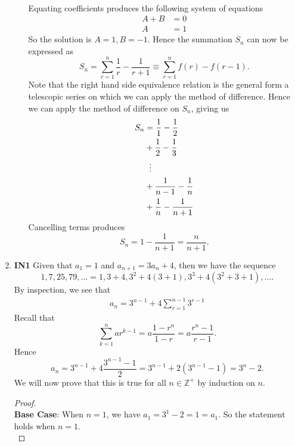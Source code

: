 \documentclass[12pt,oneside]{book}
\begin{document}
\begin{enumerate}
\begin{enumerate}
\begin{align*}
            \end{align*}
            Equating coefficients produces the following system of equations \begin{align*}
                A + B &= 0 \\
                A &= 1
            \end{align*}
            So the solution is $A = 1, B = -1$. Hence the summation $S_n$ can now be expressed as \[
                S_n = \sum_{r=1}^{n} \frac{1}{r} - \frac{1}{r+1} \equiv \sum_{r=1}^{n} f(r) - f(r-1)
            .\] 
            Note that the right hand side equivalence relation is the general form a telescopic series on which we can apply the method of difference. Hence we can apply the method of difference on $S_n$, giving us \begin{align*}
                S_n &= \frac{1}{1} - \frac{1}{2} \\
                    &+ \frac{1}{2} - \frac{1}{3} \\
                    &\hspace{2mm}\vdots \\
                    &+ \frac{1}{n-1} - \frac{1}{n} \\
                    &+ \frac{1}{n} - \frac{1}{n+1}
            \end{align*}
            Cancelling terms produces \[
                S_n = 1 - \frac{1}{n+1} = \frac{n}{n+1}
            .\] 
        \end{enumerate}
        \item \textbf{IN1} Given that $a_1 = 1$ and $a_{n +1} = 3 a_n + 4$, then we have the sequence \[
            1, 7, 25, 79, \ldots = 1, 3 + 4, 3^2 + 4(3 + 1), 3^3 + 4(3^2 + 3 + 1), \ldots
        .\]  By inspection, we see that \begin{align*}
            a_n = 3^{n - 1} + 4 \sum_{r=1}^{n-1} 3^{r-1}
        \end{align*}
        Recall that \[
            \sum_{k=1}^{n} ar^{k - 1} = a \frac{1 - r^n}{1 - r} = a \frac{r^n - 1}{r - 1}
        .\] Hence \[
            a_n = 3^{n - 1} + 4 \frac{3^{n-1}-1}{2} = 3^{n-1} + 2(3^{n-1} - 1) = 3^n - 2
        .\] We will now prove that this is true for all $n \in \mathbb{Z}^+$ by induction on $n$.
        \begin{proof} \hspace{1mm} \\
            \textbf{Base Case}: When $n = 1$, we have $a_1 = 3^1 - 2 = 1 = a_1$. So the statement holds when $n = 1$. \\

\end{proof}
\end{enumerate}
\end{document}
